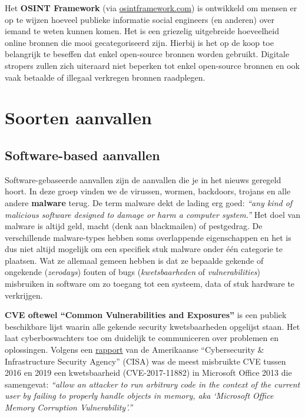 \documentclass[
  10pt,
  dutch,
  paper=a4,
  ,captions=tableheading
]{scrbook}
\begin{document}
Het \textbf{OSINT Framework} (via
\href{https://osintframework.com/}{osintframework.com}) is ontwikkeld om
mensen er op te wijzen hoeveel publieke informatie social engineers (en
anderen) over iemand te weten kunnen komen. Het is een griezelig
uitgebreide hoeveelheid online bronnen die mooi gecategoriseerd zijn.
Hierbij is het op de koop toe belangrijk te beseffen dat enkel
open-source bronnen worden gebruikt. Digitale stropers zullen zich
uiteraard niet beperken tot enkel open-source bronnen en ook vaak
betaalde of illegaal verkregen bronnen raadplegen.

\section{Soorten aanvallen}\label{soorten-aanvallen}

\subsection{Software-based aanvallen}\label{software-based-aanvallen}

Software-gebaseerde aanvallen zijn de aanvallen die je in het nieuws
geregeld hoort. In deze groep vinden we de virussen, wormen, backdoors,
trojans en alle andere \textbf{malware} terug. De term malware dekt de
lading erg goed: \emph{``any kind of malicious software designed to
damage or harm a computer system.''} Het doel van malware is altijd
geld, macht (denk aan blackmailen) of pestgedrag. De verschillende
malware-types hebben soms overlappende eigenschappen en het is dus niet
altijd mogelijk om een specifiek stuk malware onder één categorie te
plaatsen. Wat ze allemaal gemeen hebben is dat ze bepaalde gekende of
ongekende (\emph{zerodays}) fouten of bugs (\emph{kwetsbaarheden} of
\emph{vulnerabilities}) misbruiken in software om zo toegang tot een
systeem, data of stuk hardware te verkrijgen.

\begin{tipblock}
\textbf{CVE oftewel ``Common Vulnerabilities and Exposures''} is een
publiek beschikbare lijst waarin alle gekende security kwetsbaarheden
opgelijst staan. Het laat cyberboswachters toe om duidelijk te
communiceren over problemen en oplossingen. Volgens een
\href{https://www.cisa.gov/uscert/ncas/alerts/aa20-133a}{rapport} van de
Amerikaanse ``Cybersecurity \& Infrastructure Security Agency'' (CISA)
was de meest misbruikte CVE tussen 2016 en 2019 een kwetsbaarheid
(CVE-2017-11882) in Microsoft Office 2013 die samengevat: \emph{``allow
an attacker to run arbitrary code in the context of the current user by
failing to properly handle objects in memory, aka `Microsoft Office
Memory Corruption Vulnerability'.''}
\end{tipblock}
\end{document}
